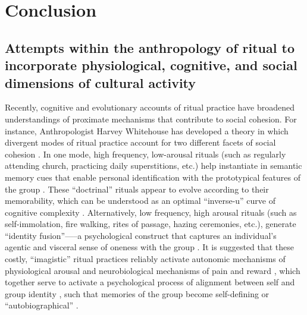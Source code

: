 








\section{Conclusion}











 \subsection{Attempts within the anthropology of ritual to incorporate physiological, cognitive, and social dimensions of cultural activity\label{sect:cogEvAnth}}

 Recently, cognitive and evolutionary accounts of ritual practice have  broadened understandings of proximate mechanisms that contribute to social cohesion.  For instance, Anthropologist Harvey Whitehouse has developed a theory in which divergent modes of ritual practice account for two different facets of social cohesion \citep[commonly known as the ``modes theory''][]{Whitehouse1996,Whitehouse2004,Whitehouse2014}.  In one mode, high frequency, low-arousal rituals (such as regularly attending church, practicing daily superstitions, etc.) help instantiate in semantic memory cues that enable personal identification with the prototypical features of the group \cite[i.e., ``group identification,'' see][]{Turner1987}. These ``doctrinal'' rituals appear to evolve according to their memorability, which can be understood as an optimal ``inverse-u'' curve of cognitive complexity \citep[][]{Whitehouse2005,Kapitany2015}.  Alternatively, low frequency, high arousal rituals (such as self-immolation, fire walking, rites of passage, hazing ceremonies, etc.), generate ``identity fusion''—--a psychological construct that captures an individual’s agentic and visceral sense of oneness with the group \citep{Swann2009,Swann2015}.  It is suggested that these costly, ``imagistic'' ritual practices reliably activate autonomic mechanisms of physiological arousal \citep{Swann2010,Jackson2018} and neurobiological mechanisms of pain and reward \citep{Fischer2014a}, which together serve to activate a psychological process of alignment between self and group identity \citep{Xygalatas2013}, such that memories of the group become self-defining or ``autobiographical'' \citep[see][]{Whitehouse2014}.

